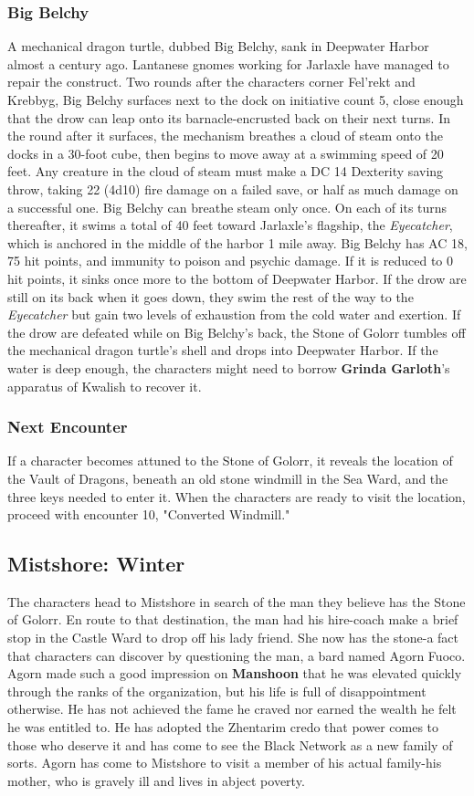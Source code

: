 \documentclass[10pt,a4paper,twoside,twocolumn,openany,nodeprecatedcode]{dndbook}
\begin{document}
\subsubsection{Big Belchy}
A mechanical dragon turtle, dubbed Big Belchy, sank in Deepwater Harbor almost a century ago. Lantanese gnomes working for Jarlaxle have managed to repair the construct. Two rounds after the characters corner Fel'rekt and Krebbyg, Big Belchy surfaces next to the dock on initiative count 5, close enough that the drow can leap onto its barnacle-encrusted back on their next turns.
In the round after it surfaces, the mechanism breathes a cloud of steam onto the docks in a 30-foot cube, then begins to move away at a swimming speed of 20 feet. Any creature in the cloud of steam must make a DC 14 Dexterity saving throw, taking 22 (4d10) fire damage on a failed save, or half as much damage on a successful one. Big Belchy can breathe steam only once. On each of its turns thereafter, it swims a total of 40 feet toward Jarlaxle's flagship, the \textit{Eyecatcher}, which is anchored in the middle of the harbor 1 mile away.
Big Belchy has AC 18, 75 hit points, and immunity to poison and psychic damage. If it is reduced to 0 hit points, it sinks once more to the bottom of Deepwater Harbor. If the drow are still on its back when it goes down, they swim the rest of the way to the \textit{Eyecatcher} but gain two levels of exhaustion from the cold water and exertion.
If the drow are defeated while on Big Belchy's back, the Stone of Golorr tumbles off the mechanical dragon turtle's shell and drops into Deepwater Harbor. If the water is deep enough, the characters might need to borrow \textbf{Grinda Garloth}'s apparatus of Kwalish to recover it.
\subsubsection{Next Encounter}
If a character becomes attuned to the Stone of Golorr, it reveals the location of the Vault of Dragons, beneath an old stone windmill in the Sea Ward, and the three keys needed to enter it. When the characters are ready to visit the location, proceed with encounter 10, "Converted Windmill."
\subsection{Mistshore: Winter}
The characters head to Mistshore in search of the man they believe has the Stone of Golorr. En route to that destination, the man had his hire-coach make a brief stop in the Castle Ward to drop off his lady friend. She now has the stone-a fact that characters can discover by questioning the man, a bard named Agorn Fuoco.
Agorn made such a good impression on \textbf{Manshoon} that he was elevated quickly through the ranks of the organization, but his life is full of disappointment otherwise. He has not achieved the fame he craved nor earned the wealth he felt he was entitled to. He has adopted the Zhentarim credo that power comes to those who deserve it and has come to see the Black Network as a new family of sorts. Agorn has come to Mistshore to visit a member of his actual family-his mother, who is gravely ill and lives in abject poverty.
\end{document}
